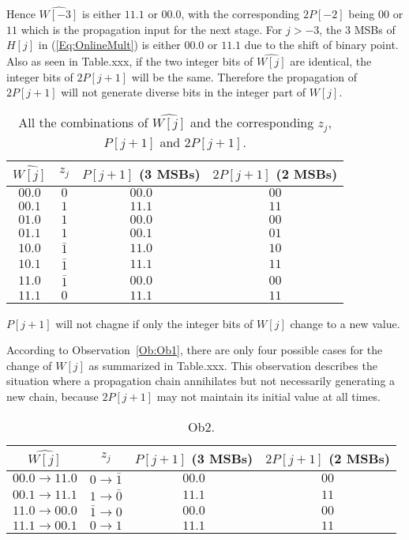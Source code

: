 \documentclass[a4paper, 11pt]{article}
\newtheorem{Ob}{\hskip\parindent\bf{Observation}}[]
\begin{document}
Hence $\widehat{W[-3]}$ is either $11.1$ or $00.0$, with the corresponding $2P[-2]$ being $00$ or $11$ which is the propagation input for the next stage. For $j>-3$, the 3 MSBs of $H[j]$ in (\ref{Eq:OnlineMult}) is either $00.0$ or $11.1$ due to the shift of binary point. Also as seen in Table.xxx, if the two integer bits of $\widehat{W[j]}$ are identical, the integer bits of $2P[j+1]$ will be the same. Therefore the propagation of $2P[j+1]$ will not generate diverse bits in the integer part of $W[j]$.
%
\begin{table}[htbp]
\caption{All the combinations of $\widehat{W[j]}$ and the corresponding $z_j$, $P[j+1]$ and $2P[j+1]$.}
\centering
\begin{tabular}{c|ccc}
\toprule
 $\widehat{W[j]}$ & $z_j$ & $P[j+1]$ (3 MSBs)  & $2P[j+1]$ (2 MSBs) \\ \midrule
 $00.0$ & $0$ & $00.0$ & $00$\\
 $00.1$ & $1$ & $11.1$ & $11$\\
 $01.0$ & $1$ & $00.0$ & $00$\\
 $01.1$ & $1$ & $00.1$ & $01$\\
 $10.0$ & $\bar{1}$ & $11.0$ & $10$\\
 $10.1$ & $\bar{1}$ & $11.1$ & $11$\\
 $11.0$ & $\bar{1}$ & $00.0$ & $00$\\
 $11.1$ & $0$ & $11.1$ & $11$\\ \bottomrule
\end{tabular}
\label{Tab:Observation1}
\end{table}

\begin{Ob}\label{Ob:Ob2}
    $P[j+1]$ will not chagne if only the integer bits of $W[j]$ change to a new value.
\end{Ob}

According to Observation~\ref{Ob:Ob1}, there are only four possible cases for the change of $W[j]$ as summarized in Table.xxx. This observation describes the situation where a propagation chain annihilates but not necessarily generating a new chain, because $2P[j+1]$ may not maintain its initial value at all times.
%
\begin{table}[htbp]
\caption{Ob2.}
\centering
\begin{tabular}{c|ccc}
\toprule
 $\widehat{W[j]}$ & $z_j$ & $P[j+1]$ (3 MSBs)  & $2P[j+1]$ (2 MSBs) \\ \midrule
 $00.0\rightarrow11.0$ & $0\rightarrow\bar{1}$ & $00.0$ & $00$\\
 $00.1\rightarrow11.1$ & $1\rightarrow\bar{0}$ & $11.1$ & $11$\\
 $11.0\rightarrow00.0$ & $\bar{1}\rightarrow0$ & $00.0$ & $00$\\
 $11.1\rightarrow00.1$ & $0\rightarrow{1}$ & $11.1$ & $11$\\ \bottomrule
\end{tabular}
\label{Tab:Observation2}
\end{table}
\end{document}
